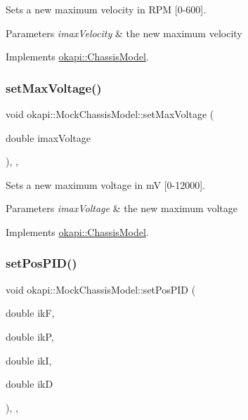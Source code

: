 Sets a new maximum velocity in R\+PM \mbox{[}0-\/600\mbox{]}. 


\begin{DoxyParams}{Parameters}
{\em imax\+Velocity} & the new maximum velocity \\
\hline
\end{DoxyParams}


Implements \mbox{\hyperlink{classokapi_1_1ChassisModel_ae7fcb4cc95fdd7fd3c8f8388b4a698b2}{okapi\+::\+Chassis\+Model}}.

\mbox{\label{classokapi_1_1MockChassisModel_a3876a1624830f5bcd7565e2ea7465ab9}} 
\subsubsection{\texorpdfstring{setMaxVoltage()}{setMaxVoltage()}}
{\footnotesize\ttfamily void okapi\+::\+Mock\+Chassis\+Model\+::set\+Max\+Voltage (\begin{DoxyParamCaption}\item[{double}]{imax\+Voltage }\end{DoxyParamCaption})\hspace{0.3cm}{\ttfamily [inline]}, {\ttfamily [override]}, {\ttfamily [virtual]}}



Sets a new maximum voltage in mV \mbox{[}0-\/12000\mbox{]}. 


\begin{DoxyParams}{Parameters}
{\em imax\+Voltage} & the new maximum voltage \\
\hline
\end{DoxyParams}


Implements \mbox{\hyperlink{classokapi_1_1ChassisModel_a2fb261636b79e118f22530cc3fce4f41}{okapi\+::\+Chassis\+Model}}.

\mbox{\label{classokapi_1_1MockChassisModel_af485c125959b578593f7be122abaecf0}} 
\subsubsection{\texorpdfstring{setPosPID()}{setPosPID()}}
{\footnotesize\ttfamily void okapi\+::\+Mock\+Chassis\+Model\+::set\+Pos\+P\+ID (\begin{DoxyParamCaption}\item[{double}]{ikF,  }\item[{double}]{ikP,  }\item[{double}]{ikI,  }\item[{double}]{ikD }\end{DoxyParamCaption})\hspace{0.3cm}{\ttfamily [inline]}, {\ttfamily [override]}, {\ttfamily [virtual]}}



